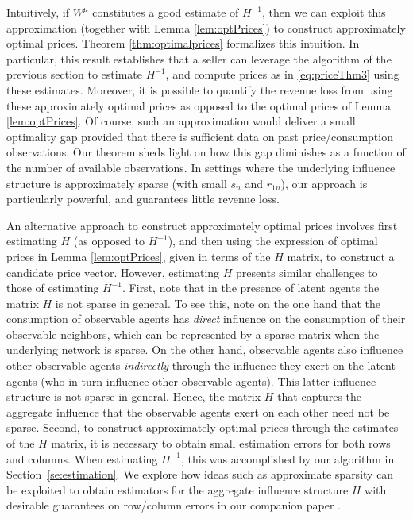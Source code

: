 \documentclass[opre,nonblindrev]{informs3} %
\begin{document}
Intuitively, if 
$W^\mu$ constitutes a good estimate of $H^{-1}$, then we can exploit this approximation (together with Lemma \ref{lem:optPrices})
to construct
 approximately optimal prices.
Theorem \ref{thm:optimalprices} formalizes this intuition.
In particular,
this result establishes that
a seller can
 leverage the algorithm of the previous section to estimate $H^{-1}$,  and  compute prices as in \eqref{eq:priceThm3}
 using these estimates.
 Moreover, it is possible to quantify the revenue loss from using these approximately optimal prices as opposed to the optimal prices of Lemma \ref{lem:optPrices}.
Of course, such an approximation would deliver a small optimality gap provided that there is sufficient data on past price/consumption observations. Our theorem sheds light on how this gap diminishes as a function of the number of available observations. In settings where the underlying influence structure is approximately sparse (with small $s_n$ and $r_{1n}$), our approach is particularly powerful, and guarantees little revenue loss.

\begin{remark}
	An alternative approach to construct approximately optimal prices involves first estimating $H$ (as opposed to $H^{-1}$), and then using the expression of optimal prices in Lemma \ref{lem:optPrices}, given in terms of the $H$ matrix, to construct a candidate price vector.
	However, estimating  $H$ presents similar challenges to those of estimating $H^{-1}$.
First, note that in the presence of latent agents the matrix $H$ is not sparse in general.
	To see this,  note on the one hand  that the consumption of observable agents has \emph{direct} influence on the consumption of their observable neighbors, which can be represented by a sparse matrix when the underlying network is sparse.  On the other hand, observable agents also influence other observable agents \emph{indirectly} through the influence they exert on the latent agents (who in turn influence other observable agents). This latter influence structure  is not sparse in general. 	 Hence, the  matrix $H$ that captures the aggregate influence that the observable agents exert on each other need not be sparse.
	Second,  to construct approximately optimal prices through the estimates of the $H$ matrix, it is necessary to obtain  small  estimation errors for both rows and columns.
	When estimating $H^{-1}$,
	this was accomplished by our algorithm in Section~\ref{se:estimation}.
	We explore how ideas such as approximate sparsity can be exploited to obtain estimators 
	for the aggregate influence structure $H$
	with desirable guarantees on row/column errors in our companion paper \citet{ata2018IVnetwork}. \hfill \halmos
\end{remark}
\end{document}
